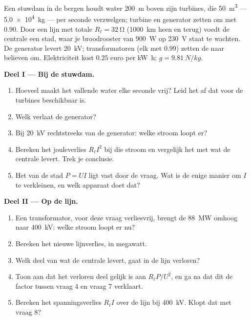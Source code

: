 \begin{problem}
\label{pb:g11:circuits-and-power:1}
Een stuwdam in de bergen houdt water \qty{200}{m} boven zijn turbines,
die \qty{50}{m^3} --- \qty{5.0e4}{kg} --- per seconde verzwelgen; turbine
en generator zetten om met  $0.90$. Door een lijn met totale
 $R_\ell = \qty{32}{\ohm}$ (\qty{1000}{km} heen en terug) voedt
de centrale een stad, waar je broodrooster van \qty{900}{W} op
\qty{230}{V} staat te wachten. De generator levert \qty{20}{kV};
transformatoren (elk met  $0.99$) zetten de  naar
believen om. Elektriciteit kost $0.25$ euro per \unit{kW.h};
$g = \qty{9.81}{N/kg}$.

\medskip
\noindent\textbf{Deel I --- Bij de stuwdam.}
\begin{enumerate}
  \item Hoeveel  maakt het vallende water elke seconde
        vrij? Leid het  af dat voor de turbines beschikbaar is.
  \item Welk  verlaat de generator?
  \item Bij \qty{20}{kV} rechtstreeks van de generator: welke stroom
        loopt er?
  \item Bereken het jouleverlies $R_\ell I^2$ bij die stroom en vergelijk
        het met wat de centrale levert. Trek je conclusie.
  \item Het  van de stad $P = UI$ ligt vast door de vraag. Wat is
        de enige manier om $I$ te verkleinen, en welk apparaat doet dat?
\end{enumerate}

\medskip
\noindent\textbf{Deel II --- Op de lijn.}
\begin{enumerate}[resume]
  \item Een transformator, voor deze vraag verliesvrij, brengt de
        \qty{88}{MW} omhoog naar \qty{400}{kV}: welke stroom loopt er nu?
  \item Bereken het nieuwe lijnverlies, in megawatt.
  \item Welk deel van wat de centrale levert, gaat in de lijn verloren?
  \item Toon aan dat het verloren deel gelijk is aan $R_\ell P/U^2$, en
        ga na dat dit de factor tussen vraag 4 en vraag 7 verklaart.
  \item Bereken het spanningsverlies $R_\ell I$ over de lijn bij
        \qty{400}{kV}. Klopt dat met vraag 8?
\end{enumerate}


\end{problem}
